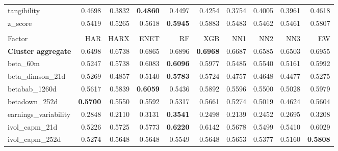 \begin{longtable}{>{\raggedright\arraybackslash}p{2.6cm}rrrrrrrrr}
tangibility & 0.4698 & 0.3832 & \textbf{\cellcolor{blue!10}0.4860} & 0.4497 & 0.4254 & 0.3754 & 0.4005 & 0.3961 & 0.4618 \\
z\_score & 0.5419 & 0.5265 & \cellcolor{blue!10}0.5618 & \textbf{\cellcolor{blue!10}0.5945} & \cellcolor{blue!10}0.5883 & \cellcolor{blue!10}0.5483 & \cellcolor{blue!10}0.5462 & \cellcolor{blue!10}0.5461 & \cellcolor{blue!10}0.5807 \\
\hline
\multicolumn{10}{@{}l}{\textit{Panel E. Low Risk}} \\
\hline
Factor & HAR & HARX & ENET & RF & XGB & NN1 & NN2 & NN3 & EW \\
\hline
\textbf{Cluster aggregate} & 0.6498 & \cellcolor{blue!10}0.6738 & \cellcolor{blue!10}0.6865 & \cellcolor{blue!10}0.6896 & \textbf{\cellcolor{blue!10}0.6968} & \cellcolor{blue!10}0.6687 & \cellcolor{blue!10}0.6585 & \cellcolor{blue!10}0.6503 & \cellcolor{blue!10}0.6955 \\
beta\_60m & 0.5247 & \cellcolor{blue!10}0.5738 & \cellcolor{blue!10}0.6083 & \textbf{\cellcolor{blue!10}0.6096} & \cellcolor{blue!10}0.5977 & \cellcolor{blue!10}0.5485 & \cellcolor{blue!10}0.5540 & 0.5161 & \cellcolor{blue!10}0.5992 \\
beta\_dimson\_21d & 0.5269 & 0.4857 & 0.5140 & \textbf{\cellcolor{blue!10}0.5783} & \cellcolor{blue!10}0.5724 & 0.4757 & 0.4648 & 0.4477 & \cellcolor{blue!10}0.5275 \\
betabab\_1260d & 0.5617 & \cellcolor{blue!10}0.5839 & \textbf{\cellcolor{blue!10}0.6059} & 0.5436 & \cellcolor{blue!10}0.5892 & 0.5596 & 0.5500 & 0.5028 & \cellcolor{blue!10}0.5979 \\
betadown\_252d & \textbf{0.5700} & 0.5550 & 0.5592 & 0.5317 & 0.5661 & 0.5274 & 0.5019 & 0.4624 & 0.5604 \\
earnings\_variability & 0.2848 & 0.2110 & \cellcolor{blue!10}0.3131 & \textbf{\cellcolor{blue!10}0.3541} & 0.2498 & 0.2139 & 0.2452 & 0.2695 & \cellcolor{blue!10}0.3208 \\
ivol\_capm\_21d & 0.5226 & \cellcolor{blue!10}0.5725 & \cellcolor{blue!10}0.5773 & \textbf{\cellcolor{blue!10}0.6220} & \cellcolor{blue!10}0.6142 & \cellcolor{blue!10}0.5678 & \cellcolor{blue!10}0.5499 & \cellcolor{blue!10}0.5410 & \cellcolor{blue!10}0.6029 \\
ivol\_capm\_252d & 0.5274 & \cellcolor{blue!10}0.5648 & \cellcolor{blue!10}0.5648 & \cellcolor{blue!10}0.5549 & \cellcolor{blue!10}0.5648 & \cellcolor{blue!10}0.5653 & \cellcolor{blue!10}0.5377 & 0.5160 & \textbf{\cellcolor{blue!10}0.5808} \\

\end{longtable}
